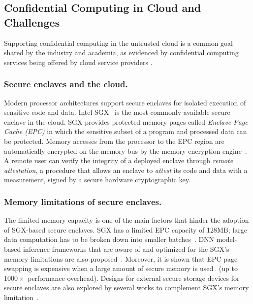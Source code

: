 \newcommand{\goal}[1]{\hyperref[g#1]{O#1}}

\subsection{Confidential Computing in Cloud and Challenges}
\label{subsec:confidential}

Supporting confidential computing in the untrusted cloud is a common goal shared by the industry and academia, as evidenced by confidential computing services being offered by cloud service providers \cite{azure,google-confidential-computing,nitro}. 

\subsubsection{Secure enclaves and the cloud. }
Modern processor architectures support secure enclaves for isolated execution of sensitive code and data. Intel SGX~\cite{sgx} is the most commonly available secure enclave in the cloud. SGX provides protected memory pages called \emph{Enclave Page Cache (EPC)} in which the sensitive subset of a program and processed data can be protected. Memory accesses from the processor to the EPC region are automatically encrypted on the memory bus by the memory encryption engine~\cite{sgx-explained}. A remote user can verify the integrity of a deployed enclave through \emph{remote attestation}, a procedure that allows an enclave to \emph{attest} its code and data with a measurement, signed by a secure hardware cryptographic key. 

\subsubsection{Memory limitations of secure enclaves.} 
The limited memory capacity is one of the main factors that hinder the adoption of SGX-based secure enclaves. SGX has a limited EPC capacity of 128MB; large data computation has to be broken down into smaller batches~\cite{occulemency,bigmatrix}. DNN model-based inference frameworks that are aware of and optimized for the SGX's memory limitations are also proposed~\cite{occulemency,kim2020vessels}. Moreover, it is shown that EPC page swapping is expensive when a large amount of secure memory is used~\cite{zerotrace,scone} (up to $1000\times$ performance overhead). Designs for external secure storage devices for secure enclaves are also explored by several works to complement SGX's memory limitation~\cite{trustore,invisimem,obfusmem}.


